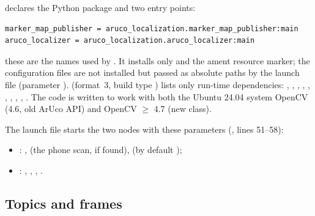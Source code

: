  declares the Python package  and two  entry points:
\begin{lstlisting}
marker_map_publisher = aruco_localization.marker_map_publisher:main
aruco_localizer = aruco_localization.aruco_localizer:main
\end{lstlisting}
these are the  names used by
. It installs only  and the ament resource marker; the
configuration files are not installed but passed as absolute paths by the launch file (parameter
).  (format~3, build type ) lists only run-time
dependencies: , , , , ,
, , , , . The code is written to
work with both the Ubuntu 24.04 system OpenCV (4.6, old ArUco API) and OpenCV $\geq$ 4.7 (new 
class).

The launch file starts the two nodes with these parameters (, lines 51--58):
\begin{itemize}
\item {}: ,  (the phone scan, if found),
   (by default );
\item {}: , ,
  , .
\end{itemize}

\subsection{Topics and frames}

